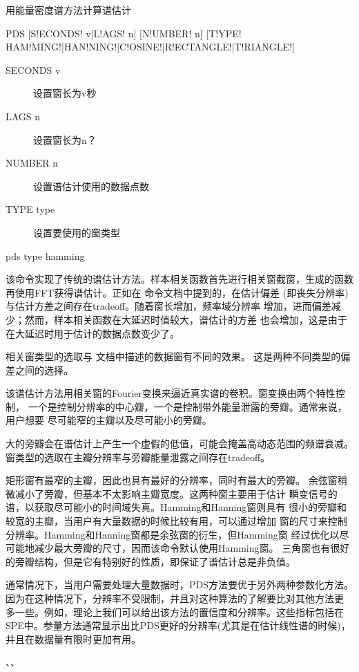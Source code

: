 \label{spe:pds}

用能量密度谱方法计算谱估计

\begin{SACSTX}
PDS [S!ECONDS! v|L!AGS! n] [N!UMBER! n]
    [T!YPE! HAM!MING!|HAN!NING!|C!OSINE!|R!ECTANGLE!|T!RIANGLE!]
\end{SACSTX}

\begin{description}
\item [SECONDS v] 设置窗长为v秒
\item [LAGS n] 设置窗长为n？
\item [NUMBER n] 设置谱估计使用的数据点数
\item [TYPE type] 设置要使用的窗类型
\end{description}

\begin{SACDFT}
pds type hamming
\end{SACDFT}

该命令实现了传统的谱估计方法。样本相关函数首先进行相关窗截窗，生成的函数
再使用FFT获得谱估计。正如在  命令文档中提到的，在估计偏差
(即丧失分辨率)与估计方差之间存在tradeoff。随着窗长增加，频率域分辨率
增加，进而偏差减少；然而，样本相关函数在大延迟时值较大，谱估计的方差
也会增加，这是由于在大延迟时用于估计的数据点数变少了。

相关窗类型的选取与  文档中描述的数据窗有不同的效果。
这是两种不同类型的偏差之间的选择。

该谱估计方法用相关窗的Fourier变换来逼近真实谱的卷积。窗变换由两个特性控制，
一个是控制分辨率的中心瓣，一个是控制带外能量泄露的旁瓣。通常来说，用户想要
尽可能窄的主瓣以及尽可能小的旁瓣。

大的旁瓣会在谱估计上产生一个虚假的低值，可能会掩盖高动态范围的频谱衰减。
窗类型的选取在主瓣分辨率与旁瓣能量泄露之间存在tradeoff。

矩形窗有最窄的主瓣，因此也具有最好的分辨率，同时有最大的旁瓣。
余弦窗稍微减小了旁瓣，但基本不太影响主瓣宽度。这两种窗主要用于估计
瞬变信号的谱，以获取尽可能小的时间域失真。Hamming和Hanning窗则具有
很小的旁瓣和较宽的主瓣，当用户有大量数据的时候比较有用，可以通过增加
窗的尺寸来控制分辨率。Hamming和Hanning窗都是余弦窗的衍生，但Hamming窗
经过优化以尽可能地减少最大旁瓣的尺寸，因而该命令默认使用Hamming窗。
三角窗也有很好的旁瓣结构，但是它有特别好的性质，即保证了谱估计总是非负值。

通常情况下，当用户需要处理大量数据时，PDS方法要优于另外两种参数化方法。
因为在这种情况下，分辨率不受限制，并且对这种算法的了解要比对其他方法更
多一些。例如，理论上我们可以给出该方法的置信度和分辨率。这些指标包括在
SPE中。参量方法通常显示出比PDS更好的分辨率(尤其是在估计线性谱的时候)，
并且在数据量有限时更加有用。

、、
